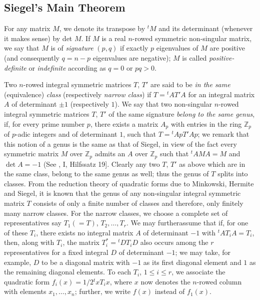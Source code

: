 \subsection{Siegel's Main Theorem}\label{chap4:sec5:subsec1} %

For any matrix $M$, we denote its transpose by ${}^{t}M$ and its
determinant (whenever it makes sense) by det $M$. If $M$ is a real
$n$-rowed symmetric non-singular matrix, we say that $M$ is of {\em
  signature} $(p,q)$ if exactly $p$ eigenvalues of $M$ are positive
(and consequently $q=n-p$ eigenvalues are negative); $M$ is called
{\em positive-definite} or {\em indefinite} according as $q=0$ or
$pq>0$.

Two $n$-rowed integral symmetric matrices $T$, $T'$ are said to be
{\em in the same} (equivalence) {\em class} (respectively {\em narrow
  class}) if $T={}^{t}AT'A$ for an integral matrix $A$ of determinant
$\pm 1$ (respectively $1$). We say that two non-singular $n$-rowed
integral symmetric matrices $T$, $T'$ of the same signature {\em
  belong to the same genus}, if, for every prime number $p$, there
exists a matrix $A_{p}$ with entries in the ring $\mathbb{Z}_{p}$ of
$p$-adic integers and of determinant $1$, such that $T={}^{t}ApT'Ap$;
we remark that this notion of a genus is the same as that of Siegel,
in view of the fact every symmetric matrix $M$ over $\mathbb{Z}_{p}$
admits an $A$ over $\mathbb{Z}_{p}$ such that ${}^{t}AMA=M$ and $\det
A=-1$ (See \cite{Sie 1}, I, Hilfssatz 19]. Clearly any two $T$, $T'$ as
  above which are in the same class, belong to the same genus as well;
  thus the genus of $T$ splits into classes. From the reduction theory
  of quadratic forms due to Minkowski, Hermite and Siegel, it is known
  that the genus of any non-singular integral symmetric matrix $T$
  consists of only a finite number of classes and therefore, only
  finitely many narrow classes. For the narrow classes, we choose a
  complete set of representatives say $T_{1}(=T)$,
  $T_{2},\ldots,T_{r}$. We may further\pageoriginale assume that if,
  for one of these $T_{i}$, there exists no integral matrix $A$ of
  determinant $-1$ with ${}^{t}AT_{i}A=T_{i}$, then, along with
  $T_{i}$, the matrix $T^{\ast}_{i}={}^{t}DT_{i}D$ also occurs among
  the $r$ representatives for a fixed integral $D$ of determinant
  $-1$; we may take, for example, $D$ to be a diagonal matrix with
  $-1$ as its first diagonal element and $1$ as the remaining diagonal
  elements. To each $T_{i}$, $1\leq i\leq r$, we associate the
  quadratic form $f_{i}(x)=1/2{}^{t}xT_{i}x$, where $x$ now denotes
  the $n$-rowed column with elements $x_{1},\ldots,x_{n}$; further, we
  write $f(x)$ instead of $f_{1}(x)$.

